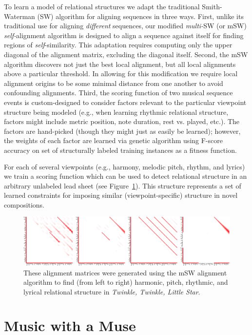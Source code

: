 \documentclass[letterpaper]{article}
\begin{document}
To learn a model of relational structures we adapt the traditional Smith-Waterman (SW) algorithm for aligning sequences \cite{smite1981identification} in three ways. First, unlike its traditional use for aligning \emph{different} sequences, our modified \emph{multi-}SW (or mSW) \emph{self-}alignment algorithm is designed to align a sequence against itself for finding regions of \emph{self}-similarity. This adaptation requires computing only the upper diagonal of the alignment matrix, excluding the diagonal itself. Second, the mSW algorithm discovers not just the best local alignment, but all local alignments above a particular threshold. In allowing for this modification we require local alignment origins to be some minimal distance from one another to avoid confounding alignments. Third, the scoring function of two musical sequence events is custom-designed to consider factors relevant to the particular viewpoint structure being modeled (e.g., when learning rhythmic relational structure, factors might include metric position, note duration, rest vs. played, etc.). The factors are hand-picked (though they might just as easily be learned); however, the weights of each factor are learned via genetic algorithm using F-score accuracy on set of structurally labeled training instances as a fitness function.

For each of several viewpoints (e.g., harmony, melodic pitch, rhythm, and lyrics) we train a scoring function which can be used to detect relational structure in an arbitrary unlabeled lead sheet (see Figure~\ref{fig:structure}). This structure represents a set of learned constraints for imposing similar (viewpoint-specific) structure in novel compositions.

\begin{figure}
	\centering
	\includegraphics[width=\linewidth]{structure}
	\caption{\label{fig:structure} These alignment matrices were generated using the mSW alignment algorithm to find (from left to right) harmonic, pitch, rhythmic, and lyrical relational structure in \emph{Twinkle, Twinkle, Little Star}.}
\end{figure}

\section{Music with a Muse}
\end{document}
